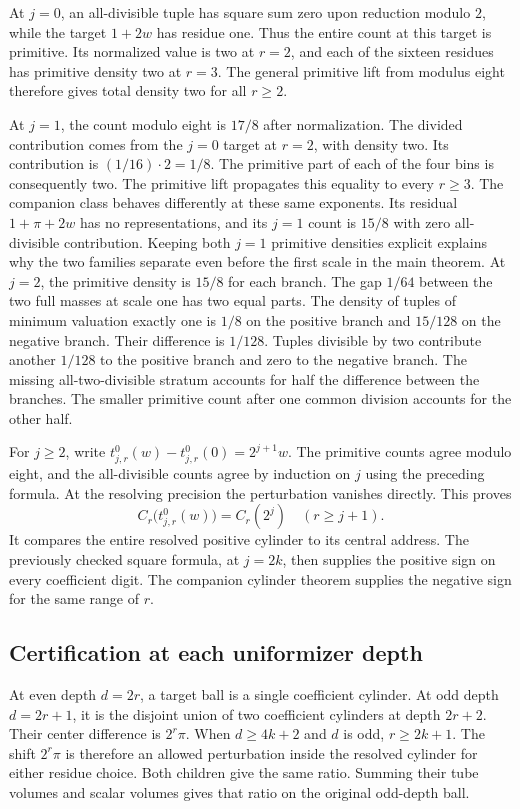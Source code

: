 \documentclass[12pt,letterpaper]{article}
\begin{document}
At $j=0$, an all-divisible tuple has square sum zero upon reduction modulo $2$, while the target $1+2w$ has residue one. Thus the entire count at this target is primitive. Its normalized value is two at $r=2$, and each of the sixteen residues has primitive density two at $r=3$. The general primitive lift from modulus eight therefore gives total density two for all $r\geq2$.

At $j=1$, the count modulo eight is $17/8$ after normalization. The divided contribution comes from the $j=0$ target at $r=2$, with density two. Its contribution is $(1/16)\cdot2=1/8$. The primitive part of each of the four bins is consequently two. The primitive lift propagates this equality to every $r\geq3$. The companion class behaves differently at these same exponents. Its residual $1+\pi+2w$ has no representations, and its $j=1$ count is $15/8$ with zero all-divisible contribution. Keeping both $j=1$ primitive densities explicit explains why the two families separate even before the first scale in the main theorem. At $j=2$, the primitive density is $15/8$ for each branch. The gap $1/64$ between the two full masses at scale one has two equal parts. The density of tuples of minimum valuation exactly one is $1/8$ on the positive branch and $15/128$ on the negative branch. Their difference is $1/128$. Tuples divisible by two contribute another $1/128$ to the positive branch and zero to the negative branch. The missing all-two-divisible stratum accounts for half the difference between the branches. The smaller primitive count after one common division accounts for the other half.

For $j\geq2$, write $t_{j,r}^0(w)-t_{j,r}^0(0)=2^{j+1}w$. The primitive counts agree modulo eight, and the all-divisible counts agree by induction on $j$ using the preceding formula. At the resolving precision the perturbation vanishes directly. This proves
\[
 C_r\bigl(t_{j,r}^0(w)\bigr)=C_r(2^j) \quad (r\geq j+1).
\]
It compares the entire resolved positive cylinder to its central address. The previously checked square formula, at $j=2k$, then supplies the positive sign on every coefficient digit. The companion cylinder theorem supplies the negative sign for the same range of $r$.

\subsection{Certification at each uniformizer depth}
At even depth $d=2r$, a target ball is a single coefficient cylinder. At odd depth $d=2r+1$, it is the disjoint union of two coefficient cylinders at depth $2r+2$. Their center difference is $2^r\pi$. When $d\geq4k+2$ and $d$ is odd, $r\geq2k+1$. The shift $2^r\pi$ is therefore an allowed perturbation inside the resolved cylinder for either residue choice. Both children give the same ratio. Summing their tube volumes and scalar volumes gives that ratio on the original odd-depth ball.
\end{document}
